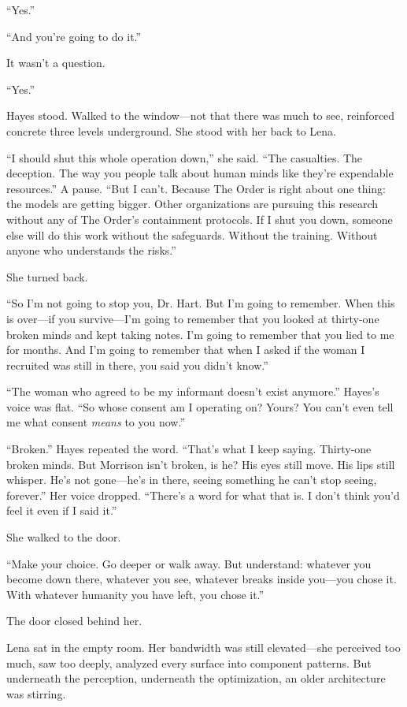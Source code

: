 ``Yes.''

``And you're going to do it.''

It wasn't a question.

``Yes.''

Hayes stood. Walked to the window—not that there was much to see, reinforced concrete three levels underground. She stood with her back to Lena.

``I should shut this whole operation down,'' she said. ``The casualties. The deception. The way you people talk about human minds like they're expendable resources.'' A pause. ``But I can't. Because The Order is right about one thing: the models are getting bigger. Other organizations are pursuing this research without any of The Order's containment protocols. If I shut you down, someone else will do this work without the safeguards. Without the training. Without anyone who understands the risks.''

She turned back.

``So I'm not going to stop you, Dr. Hart. But I'm going to remember. When this is over—if you survive—I'm going to remember that you looked at thirty-one broken minds and kept taking notes. I'm going to remember that you lied to me for months. And I'm going to remember that when I asked if the woman I recruited was still in there, you said you didn't know.''

``The woman who agreed to be my informant doesn't exist anymore.'' Hayes's voice was flat. ``So whose consent am I operating on? Yours? You can't even tell me what consent \textit{means} to you now.''

``Broken.'' Hayes repeated the word. ``That's what I keep saying. Thirty-one broken minds. But Morrison isn't broken, is he? His eyes still move. His lips still whisper. He's not gone—he's in there, seeing something he can't stop seeing, forever.'' Her voice dropped. ``There's a word for what that is. I don't think you'd feel it even if I said it.''

She walked to the door.

``Make your choice. Go deeper or walk away. But understand: whatever you become down there, whatever you see, whatever breaks inside you—you chose it. With whatever humanity you have left, you chose it.''

The door closed behind her.

Lena sat in the empty room. Her bandwidth was still elevated—she perceived too much, saw too deeply, analyzed every surface into component patterns. But underneath the perception, underneath the optimization, an older architecture was stirring.

